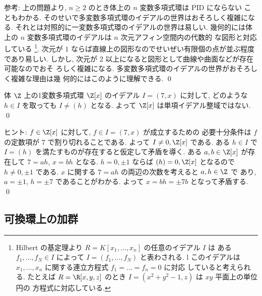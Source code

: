 \documentclass[12pt,twoside]{jarticle}
\begin{document}
\medskip
\noindent
参考: 上の問題より, $n\ge 2$ のとき体上の $n$ 変数多項式環は PID にならない
こともわかる.  そのせいで多変数多項式環のイデアルの世界はおそろしく複雑にな
る.  それとは対照的に一変数多項式環のイデアルの世界は易しい.
幾何的には体上の $n$ 変数多項式環のイデアルは $n$ 次元アフィン空間内の代数的
な図形と対応している%
\footnote{Hilbert の基定理より $R=K[x_1,\dots,x_n]$ の任意のイデアル $I$ は
  ある $f_1,\dots,f_N\in I$ によって $I=(f_1,\dots,f_N)$ と表わされる.
l  このイデアルは $x_1,\dots,x_n$ に関する連立方程式 $f_1=\dots=f_n=0$ に対応
  していると考えられる.  
  たとえば $R=\R[x,y,z]$ のとき $I=(x^2+y^2-1, z)$ は $xy$ 平面上の単位円の
  方程式に対応している.}. 
次元が $1$ ならば直線上の図形なのでせいぜい有限個の点が並ぶ程度であり易しい.
しかし, 次元が $2$ 以上になると図形として曲線や曲面などが存在可能なのでおそ
ろしく複雑になる.  多変数多項式環のイデアルの世界がおそろしく複雑な理由は幾
何的にはこのように理解できる.  
\qed


\begin{question}
\label{q:Z[x]-not-PID}
  体 $\Z$ 上の1変数多項式環 $\Z[x]$ のイデアル $I=(7,x)$ に対して,
  どのような $h\in I$ を取っても $I\ne (h)$ となる.
  よって $\Z[x]$ は単項イデアル整域ではない.
  \qed
\end{question}

\noindent
ヒント: $f\in \Z[x]$ に対して, $f\in I=(7,x)$ が成立するための
必要十分条件は $f$ の定数項が $7$ で割り切れることである.
よって $I\ne 0,\Z[x]$ である.
ある $h\in I$ で $I=(h)$ を満たすものが存在すると仮定して矛盾を導く.
ある $a,b\in\Z[x]$ が存在して $7=ah$, $x=bh$ となる.
$h=0,\pm1$ ならば $(h)=0,\Z[x]$ となるので $h\ne0,\pm1$ である.
$x$ に関する $7=ah$ の両辺の次数を考えると $a,h\in\Z$ で
あり,  $a=\pm1$, $h=\pm7$ であることがわかる.
よって $x=bh=\pm7 b$ となって矛盾する.
\qed


\subsection{可換環上の加群}
\label{sec:module}
\end{document}
